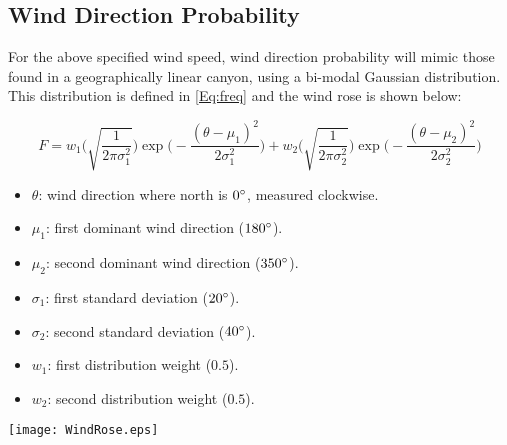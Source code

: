 \documentclass[12pt]{article}
\begin{document}
\subsection{Wind Direction Probability}

    For the above specified wind speed, wind direction probability will mimic those found in a geographically linear canyon, using a bi-modal Gaussian distribution. This distribution is defined in  \cref{Eq:freq} and the wind rose is shown below: %
    
    \begin{equation}
        F = w_1\Bigg(\sqrt{\frac{1}{2 \pi \sigma_1^2}}\Bigg)\exp\Bigg(-\frac{(\theta-\mu_1)^2}{2 \sigma_1^2}\Bigg) + w_2\Bigg(\sqrt{\frac{1}{2 \pi \sigma_2^2}}\Bigg)\exp\Bigg(-\frac{(\theta-\mu_2)^2}{2 \sigma_2^2}\Bigg)
    \label{Eq:freq}
    \end{equation}
    \begin{minipage}{.65\textwidth}
        \begin{itemize}
            \item \textbf{$\theta$}: wind direction where north is $0 \degree$, measured clockwise.
            \item \textbf{$\mu_1$}: first dominant wind direction ($180\degree$).
            \item \textbf{$\mu_2$}: second dominant wind direction ($350\degree$).
            \item \textbf{$\sigma_1$}: first standard deviation ($20 \degree$).
            \item \textbf{$\sigma_2$}: second standard deviation ($40 \degree$).
            \item \textbf{$w_1$}: first distribution weight ($0.5$).
            \item \textbf{$w_2$}: second distribution weight ($0.5$).
        \end{itemize}
    \end{minipage}
    \begin{minipage}{.4\textwidth}
        \vspace{2 cm}
        \hspace{-2 cm}
            \centering
            \texttt{[image: WindRose.eps]}
            \label{Fig:freq}
    \end{minipage}
        
\end{document}
